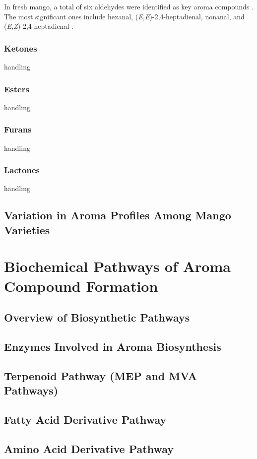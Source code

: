 In fresh mango, a total of six aldehydes were identified as key aroma compounds \cite*{A07_Bonneau2016}. The most significant ones include hexanal, (\textit{E,E})-2,4-heptadienal, nonanal, and (\textit{E,Z})-2,4-heptadienal \cite*{A07_Bonneau2016}.

\subsubsection*{Ketones}
handling

\subsubsection*{Esters}
handling

\subsubsection*{Furans}
handling

\subsubsection*{Lactones}
handling


\subsection{Variation in Aroma Profiles Among Mango Varieties}



\section{Biochemical Pathways of Aroma Compound Formation}
\subsection{Overview of Biosynthetic Pathways}
\subsection{Enzymes Involved in Aroma Biosynthesis}
\subsection{Terpenoid Pathway (MEP and MVA Pathways)}
\subsection{Fatty Acid Derivative Pathway}
\subsection{Amino Acid Derivative Pathway}


